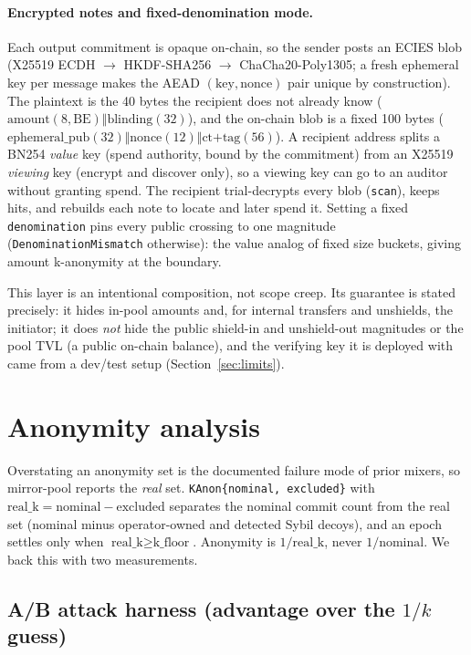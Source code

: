 \documentclass[10pt]{article}
\newcommand{\code}[1]{\texttt{#1}}
\begin{document}
\paragraph{Encrypted notes and fixed-denomination mode.} Each output commitment is
opaque on-chain, so the sender posts an ECIES blob (X25519 ECDH $\to$
HKDF-SHA256 $\to$ ChaCha20-Poly1305; a fresh ephemeral key per message makes the
AEAD $(\text{key}, \text{nonce})$ pair unique by construction). The plaintext is
the 40 bytes the recipient does not already know
($\text{amount}(8,\text{BE}) \Vert \text{blinding}(32)$), and the on-chain blob is
a fixed 100 bytes ($\text{ephemeral\_pub}(32) \Vert \text{nonce}(12) \Vert
\text{ct+tag}(56)$). A recipient address splits a BN254 \emph{value} key (spend
authority, bound by the commitment) from an X25519 \emph{viewing} key (encrypt and
discover only), so a viewing key can go to an auditor without granting spend. The
recipient trial-decrypts every blob (\code{scan}), keeps hits, and rebuilds each
note to locate and later spend it. Setting a fixed \code{denomination} pins every
public crossing to one magnitude (\code{DenominationMismatch} otherwise): the
value analog of fixed size buckets, giving amount k-anonymity at the boundary.

This layer is an intentional composition, not scope creep. Its guarantee is
stated precisely: it hides in-pool amounts and, for internal transfers and
unshields, the initiator; it does \emph{not} hide the public shield-in and
unshield-out magnitudes or the pool TVL (a public on-chain balance), and the
verifying key it is deployed with came from a dev/test setup
(Section~\ref{sec:limits}).

\section{Anonymity analysis}
\label{sec:anon}

Overstating an anonymity set is the documented failure mode of prior mixers, so
mirror-pool reports the \emph{real} set. \code{KAnon\{nominal, excluded\}} with
$\text{real\_k} = \text{nominal} - \text{excluded}$ separates the nominal commit
count from the real set (nominal minus operator-owned and detected Sybil decoys),
and an epoch settles only when $\text{real\_k} \geq \text{k\_floor}$. Anonymity is
$1/\text{real\_k}$, never $1/\text{nominal}$. We back this with two measurements.

\subsection{A/B attack harness (advantage over the $1/k$ guess)}
\end{document}
